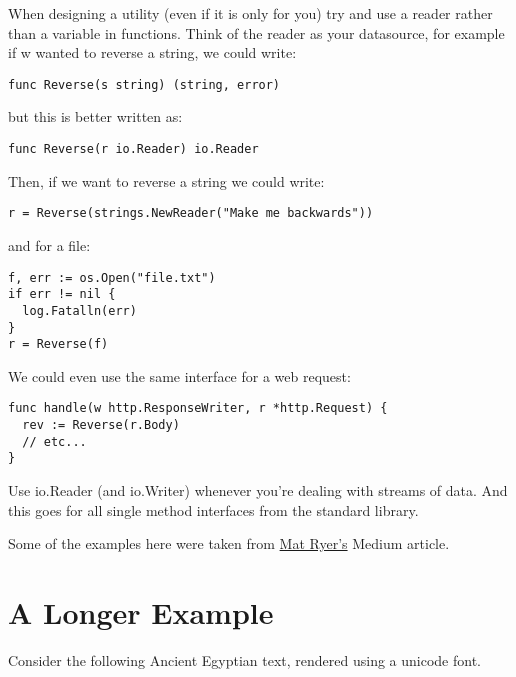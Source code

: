 When designing a utility (even if it is only for you) try and use a reader rather than a variable in functions. Think of the reader as your datasource, for example if w wanted to reverse a string, we could write:

\begin{verbatim}
func Reverse(s string) (string, error)
\end{verbatim}

but this is better written as:

\begin{verbatim}
func Reverse(r io.Reader) io.Reader
\end{verbatim}

Then, if we want to reverse a string we could write:

\begin{verbatim}
r = Reverse(strings.NewReader("Make me backwards"))
\end{verbatim}

and for a file:

\begin{verbatim}
f, err := os.Open("file.txt")
if err != nil {
  log.Fatalln(err)
}
r = Reverse(f)
\end{verbatim}

We could even use the same interface for a web request:

\begin{verbatim}
func handle(w http.ResponseWriter, r *http.Request) {
  rev := Reverse(r.Body)
  // etc...
}
\end{verbatim}


Use io.Reader (and io.Writer) whenever you’re dealing with streams of data. And this goes for all single method interfaces from the standard library.


Some of the examples here were taken from \href{https://medium.com/@matryer/golang-advent-calendar-day-seventeen-io-reader-in-depth-6f744bb4320b}{Mat Ryer's} Medium article.



\section{A Longer Example}

Consider the following Ancient Egyptian text, rendered using a unicode font.
\medskip

{\aegyptus\centering

\scalebox{1.5}{𓇓𓏏𓊵𓏙𓊩𓁹𓏃𓋀𓅂𓊹𓉻𓎟𓍋𓈋𓃀𓊖𓏤𓄋𓈐𓏦𓎟𓇾𓈅𓏤𓂦𓈉}
\par
}

